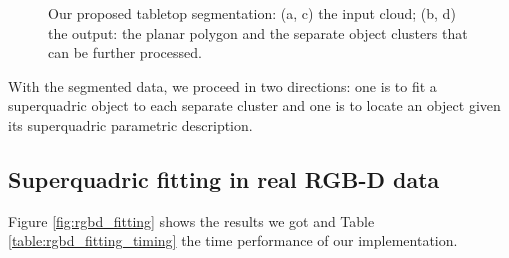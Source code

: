 \documentclass{article}
\begin{document}
\begin{figure}
\centering

\caption{Our proposed tabletop segmentation: (a, c) the input cloud; (b, d) the output: the planar polygon and the separate object clusters that can be further processed.}
\label{fig:tabletop_segmentation}
\end{figure}

With the segmented data, we proceed in two directions: one is to fit a superquadric object to each separate cluster and one is to locate an object given its superquadric parametric description.

\subsection*{Superquadric fitting in real RGB-D data}
Figure \ref{fig:rgbd_fitting} shows the results we got and Table \ref{table:rgbd_fitting_timing} the time performance of our implementation.
\end{document}
